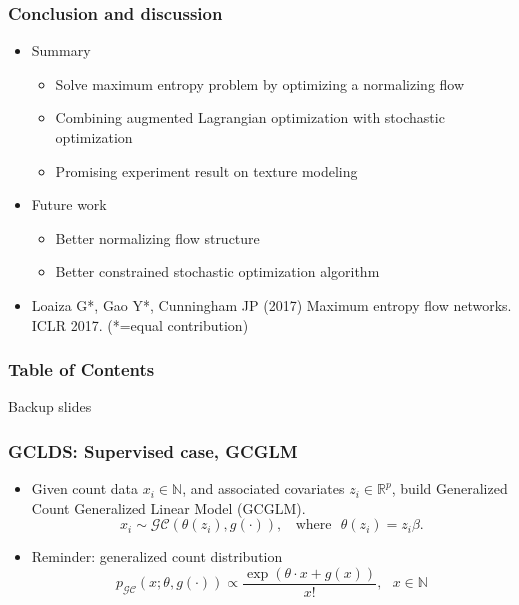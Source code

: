 \documentclass[16pt,presentation]{beamer}
\begin{document}
\begin{frame}
\frametitle{Conclusion and discussion}
\begin{itemize}
\item Summary
\begin{itemize}
\item Solve maximum entropy problem by optimizing a normalizing flow
\item Combining augmented Lagrangian optimization with stochastic optimization
\item Promising experiment result on texture modeling
\end{itemize}
\item Future work
\begin{itemize}
\item Better normalizing flow structure
\item Better constrained stochastic optimization algorithm
\end{itemize}
\item Loaiza G*, \alert{Gao Y}*, Cunningham JP (2017) Maximum entropy flow networks. ICLR 2017. (*=equal contribution) 
\end{itemize}
\end{frame}



\begin{frame}
\frametitle{Table of Contents}
\tableofcontents
\end{frame}

\begin{frame}
\begin{center}
\Large{Backup slides}
\end{center}
\end{frame}

\begin{frame}
\frametitle{GCLDS: Supervised case, GCGLM}
\begin{itemize}
\item Given count data $x_i \in \mathbb{N}$, and associated covariates $z_i \in \mathbb{R}^p$, build Generalized Count Generalized Linear Model (GCGLM).
\[x_i \sim \mathcal{GC}(\theta(z_i), g(\cdot)), ~~~~\text{where} ~~~ \theta(z_i) =  z_i \beta.\]
\item Reminder: generalized count distribution
\[p_{\mathcal{GC}}(x; \theta, g(\cdot)) \propto \frac{\exp(\theta \cdot x + g(x) )}{x!}, ~~~x \in \mathbb{N}\]
\end{itemize}
\end{frame}
\end{document}
